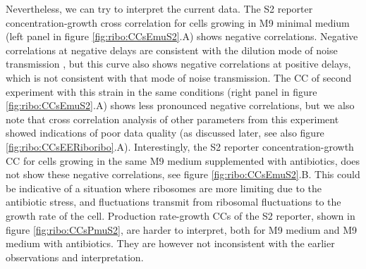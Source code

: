 Nevertheless, we can try to interpret the current data.
%
The S2 reporter concentration-growth cross correlation for cells growing in M9 minimal medium (left panel in figure \ref{fig:ribo:CCsEmuS2}.A) 
shows negative correlations.
Negative correlations at negative delays are consistent with the dilution mode of noise transmission \cite{Kiviet2014}, 
but this curve also shows negative correlations at positive delays, which is not consistent with that mode of noise transmission.
%
The CC of second experiment with this strain in the same conditions (right panel in figure \ref{fig:ribo:CCsEmuS2}.A) shows less pronounced negative correlations, 
but we also note that cross correlation analysis of other parameters from this experiment showed indications of poor data quality (as discussed later, see also figure \ref{fig:ribo:CCsEERiboribo}.A). %
%
%
Interestingly, 
the S2 reporter concentration-growth CC for cells growing in the same M9 medium supplemented with antibiotics, does not show these negative correlations, see figure \ref{fig:ribo:CCsEmuS2}.B. 
This could be indicative of a situation where ribosomes are more limiting due to the antibiotic stress, and fluctuations transmit from ribosomal fluctuations to the growth rate of the cell.
%
Production rate-growth CCs of the S2 reporter, shown in figure \ref{fig:ribo:CCsPmuS2}, are harder to interpret, both for M9 medium and M9 medium with antibiotics.
They are however not inconsistent with the earlier observations and interpretation.

